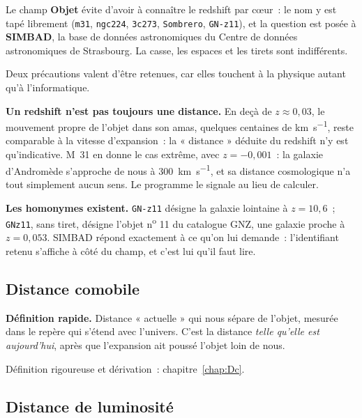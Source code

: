 \documentclass[11pt,a4paper,openany]{report}
\begin{document}
\begin{tcolorbox}[gui]
Le champ \textbf{Objet} évite d'avoir à connaître le redshift par c\oe ur~: le
nom y est tapé librement (\texttt{m31}, \texttt{ngc224}, \texttt{3c273},
\texttt{Sombrero}, \texttt{GN-z11}), et la question est posée à \textbf{SIMBAD},
la base de données astronomiques du Centre de données astronomiques de
Strasbourg. La casse, les espaces et les tirets sont indifférents.

\medskip
Deux précautions valent d'être retenues, car elles touchent à la physique
autant qu'à l'informatique.

\medskip
\textbf{Un redshift n'est pas toujours une distance.} En deçà de
$z \approx 0{,}03$, le mouvement propre de l'objet dans son amas, quelques
centaines de \si{\km\per\second}, reste comparable à la vitesse
d'expansion~: la « distance » déduite du redshift n'y est qu'indicative.
M~31 en donne le cas extrême, avec $z = -0{,}001$~: la galaxie d'Andromède
s'approche de nous à \SI{300}{\km\per\second}, et sa distance
cosmologique n'a tout simplement aucun sens. Le programme le signale au lieu
de calculer.

\medskip
\textbf{Les homonymes existent.} \texttt{GN-z11} désigne la galaxie lointaine à
$z = 10{,}6$~; \texttt{GNz11}, sans tiret, désigne l'objet n\textsuperscript{o}
11 du catalogue GNZ, une galaxie proche à $z = 0{,}053$. SIMBAD répond
exactement à ce qu'on lui demande~: l'identifiant retenu s'affiche à côté du
champ, et c'est lui qu'il faut lire.
\end{tcolorbox}

\subsection{Distance comobile}

\begin{tcolorbox}[gui]
\textbf{Définition rapide.} Distance « actuelle » qui nous sépare de l'objet,
mesurée dans le repère qui s'étend avec l'univers. C'est la distance \emph{telle
qu'elle est aujourd'hui}, après que l'expansion ait poussé l'objet loin de nous.

\medskip
Définition rigoureuse et dérivation~: chapitre~\ref{chap:Dc}.
\end{tcolorbox}

\subsection{Distance de luminosité}
\end{document}
